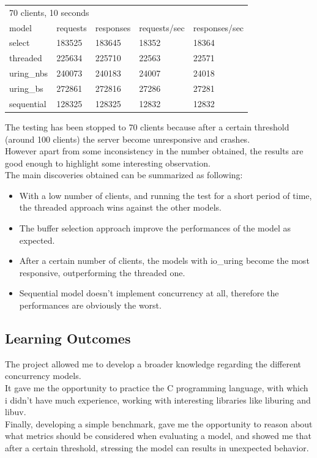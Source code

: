 \documentclass[10pt, oneside,english]{article}   	%
\begin{document}
\begin{table}[H]
\centering
\begin{tabular}{lllll}
\multicolumn{5}{l}{70 clients, 10 seconds}                       \\
model      & requests & responses & requests/sec & responses/sec \\
select     & 183525   & 183645    & 18352        & 18364         \\
threaded   & 225634   & 225710    & 22563        & 22571         \\
uring\_nbs & 240073   & 240183    & 24007        & 24018         \\
uring\_bs  & 272861   & 272816    & 27286        & 27281         \\
sequential & 128325   & 128325    & 12832        & 12832        
\end{tabular}
\end{table}

The testing has been stopped to 70 clients because after a certain threshold (around 100 clients) the server become unresponsive and crashes. \\
However apart from some inconsistency in the number obtained, the results are good enough to highlight some interesting observation. \\
The main discoveries obtained can be summarized as following:

\begin{itemize}
    \item With a low number of clients, and running the test for a short period of time, the threaded approach wins against the other models. 
    \item The buffer selection approach improve the performances of the model as expected.
    \item After a certain number of clients, the models with io\_uring become the most responsive, outperforming the threaded one.
    \item Sequential model doesn't implement concurrency at all, therefore the performances are obviously the worst.
\end{itemize}

\subsection{Learning Outcomes}

The project allowed me to develop a broader knowledge regarding the different concurrency models. \\
It gave me the opportunity to practice the C programming language, with which i didn't have much experience, working with interesting libraries like liburing and libuv. \\
Finally, developing a simple benchmark, gave me the opportunity to reason about what metrics should be considered when evaluating a model, and showed me that after a certain threshold, stressing the model can results in unexpected behavior.
\end{document}
